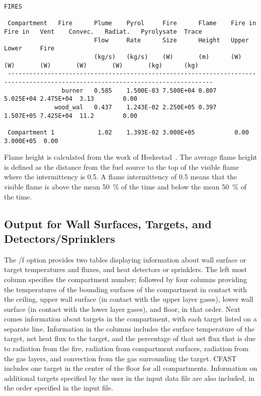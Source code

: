 \begin{lstlisting}[basicstyle=\tiny]
 FIRES

 Compartment   Fire      Plume    Pyrol     Fire      Flame    Fire in  Fire in   Vent    Convec.   Radiat.   Pyrolysate  Trace
                         Flow     Rate      Size      Height   Upper    Lower     Fire
                         (kg/s)   (kg/s)    (W)       (m)      (W)      (W)       (W)       (W)       (W)       (kg)      (kg)
 -------------------------------------------------------------------------------------------------------------------------------
                burner   0.585    1.500E-03 7.500E+04 0.807                               5.025E+04 2.475E+04  3.13        0.00
              wood_wal   0.437    1.243E-02 2.250E+05 0.397                               1.507E+05 7.425E+04  11.2        0.00

 Compartment 1            1.02    1.393E-02 3.000E+05           0.00    3.000E+05  0.00
\end{lstlisting}
Flame height is calculated from the work of Heskestad~\cite{Heskestad:2002}. The average flame height is defined as the distance from the fuel source to the top of the visible flame where the intermittency is 0.5.  A flame intermittency of 0.5 means that the visible flame is above the mean 50~\% of the time and below the mean 50~\% of the time.


\subsection{Output for Wall Surfaces, Targets, and Detectors/Sprinklers}

The /f option provides two tables displaying information about wall surface or target temperatures and fluxes, and heat detectors or sprinklers. The left most column specifies the compartment number; followed by four columns providing the temperatures of the bounding surfaces of the compartment in contact with the ceiling, upper wall surface (in contact with the upper layer gases), lower wall surface (in contact with the lower layer gases), and floor, in that order. Next comes information about targets in the compartment, with each target listed on a separate line.  Information in the columns includes the surface temperature of the target, net heat flux to the target, and the percentage of that net flux that is due to radiation from the fire, radiation from compartment surfaces, radiation from the gas layers, and convection from the gas surrounding the target.  CFAST includes one target in the center of the floor for all compartments. Information on additional targets specified by the user in the input data file are also included, in the order specified in the input file.

